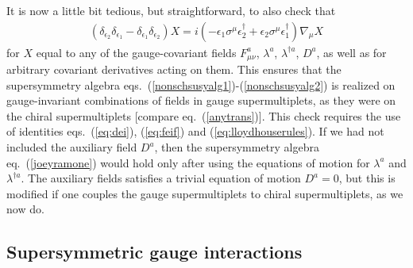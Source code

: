 \documentclass[12pt]{article}
\renewcommand{\theequation}{\arabic{section}.\arabic{equation}}
\def\beq{\begin{eqnarray}}
\def\eeq{\end{eqnarray}}
\begin{document}
It is now a little bit tedious, but straightforward, to also check that
\beq
(\delta_{\epsilon_2} \delta_{\epsilon_1} -\delta_{\epsilon_1}
\delta_{\epsilon_2} ) X = 
i (-\epsilon_1\sigma^\mu \epsilon_2^\dagger
+\epsilon_2\sigma^\mu \epsilon_1^\dagger) \nabla_\mu X
\label{joeyramone}
\eeq
for $X$ equal to any of the gauge-covariant fields $F_{\mu\nu}^a$,
$\lambda^a$, $\lambda^{\dagger a}$, $D^a$, as well as for arbitrary
covariant derivatives acting on them. This ensures that the supersymmetry
algebra eqs.~(\ref{nonschsusyalg1})-(\ref{nonschsusyalg2}) is realized on
gauge-invariant combinations of fields in gauge supermultiplets, as they
were on the chiral supermultiplets [compare eq.~(\ref{anytrans})]. This
check requires the use of identities 
eqs.~(\ref{eq:dei}), (\ref{eq:feif}) and (\ref{eq:lloydhouserules}).
If we had not included the auxiliary field
$D^a$, then the supersymmetry algebra eq.~(\ref{joeyramone}) would hold
only after using the equations of motion for $\lambda^a$ and
$\lambda^{\dagger a}$. The auxiliary fields satisfies a trivial equation
of motion $D^a=0$, but this is modified if one couples the gauge
supermultiplets to chiral supermultiplets, as we now do. 

\subsection{Supersymmetric gauge
interactions}\label{subsec:susylagr.gaugeinter}
\setcounter{footnote}{1}
\renewcommand{\theequation}{\arabic{section}.\arabic{subsection}.\arabic{equation}}
\setcounter{equation}{0}
\end{document}

